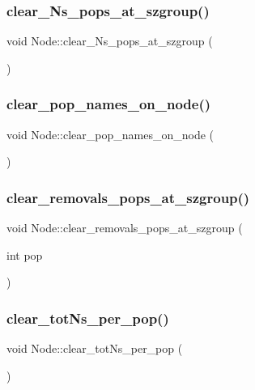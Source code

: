 \subsubsection{\texorpdfstring{clear\_Ns\_pops\_at\_szgroup()}{clear\_Ns\_pops\_at\_szgroup()}}
{\footnotesize\ttfamily void Node\+::clear\+\_\+\+Ns\+\_\+pops\+\_\+at\+\_\+szgroup (\begin{DoxyParamCaption}{ }\end{DoxyParamCaption})}

\mbox{\label{class_node_aeca936c7fb12f21f0be1c690ceee6e99}} 
\subsubsection{\texorpdfstring{clear\_pop\_names\_on\_node()}{clear\_pop\_names\_on\_node()}}
{\footnotesize\ttfamily void Node\+::clear\+\_\+pop\+\_\+names\+\_\+on\+\_\+node (\begin{DoxyParamCaption}{ }\end{DoxyParamCaption})}

\mbox{\label{class_node_ac4de3067086399747da37bb4f87459b7}} 
\subsubsection{\texorpdfstring{clear\_removals\_pops\_at\_szgroup()}{clear\_removals\_pops\_at\_szgroup()}}
{\footnotesize\ttfamily void Node\+::clear\+\_\+removals\+\_\+pops\+\_\+at\+\_\+szgroup (\begin{DoxyParamCaption}\item[{int}]{pop }\end{DoxyParamCaption})}

\mbox{\label{class_node_a2a2ec467d1c6ee5d348afb54b551dae2}} 
\subsubsection{\texorpdfstring{clear\_totNs\_per\_pop()}{clear\_totNs\_per\_pop()}}
{\footnotesize\ttfamily void Node\+::clear\+\_\+tot\+Ns\+\_\+per\+\_\+pop (\begin{DoxyParamCaption}{ }\end{DoxyParamCaption})}

